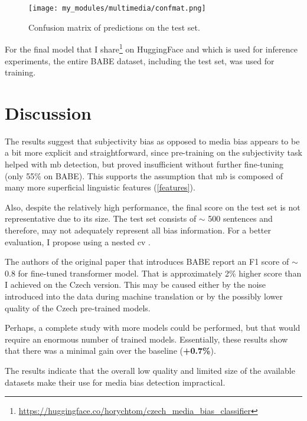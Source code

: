 \begin{figure}[h]
  \texttt{[image: my\_modules/multimedia/confmat.png]}
  \caption{Confusion matrix of predictions on the test set.}
  \label{fig:confmat}
\end{figure}

For the final model that I share\footnote{\url{https://huggingface.co/horychtom/czech_media_bias_classifier}} on HuggingFace and which is used for inference experiments, the entire BABE dataset, including the test set, was used for training.

\section{Discussion}
The results suggest that subjectivity bias as opposed to media bias appears to be a bit more explicit and straightforward, since pre-training on the subjectivity task helped with \gls{mb} detection, but proved insufficient without further fine-tuning (only 55\% on BABE). This supports the assumption that \gls{mb} is composed of many more superficial linguistic features (\ref{features}).

Also, despite the relatively high performance, the final score on the test set is not representative due to its size. The test set consists of $\sim$ 500 sentences and therefore, may not adequately represent all bias information. For a better evaluation, I propose using a nested \gls{cv} \cite{stone1974cross}.

The authors of the original paper that introduces BABE \cite{spinde2021neural} report an F1 score of $\sim$ 0.8 for fine-tuned transformer model. That is approximately 2\% higher score than I achieved on the Czech version. This may be caused either by the noise introduced into the data during machine translation or by the possibly lower quality of the Czech pre-trained models.

Perhaps, a complete study with more models could be performed, but that would require an enormous number of trained models. Essentially, these results show that there was a minimal gain over the baseline (\textbf{+0.7\%}).

The results indicate that the overall low quality and limited size of the available datasets make their use for media bias detection impractical.






